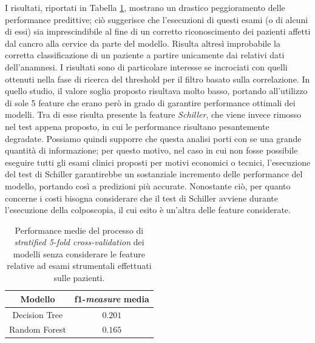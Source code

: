 I risultati, riportati in Tabella \ref{tab:noexamsscore}, mostrano un drastico peggioramento delle performance predittive; ciò suggerisce che l'esecuzioni di questi esami (o di alcuni di essi) sia imprescindibile al fine di un corretto riconoscimento dei pazienti affetti dal cancro alla cervice da parte del modello. 
Risulta altresì improbabile la corretta classificazione di un paziente a partire unicamente dai relativi dati dell'anamnesi.
I risultati sono di particolare interesse se incrociati con quelli ottenuti nella fase di ricerca del threshold per il filtro basato sulla correlazione. In quello studio, il valore soglia proposto risultava molto basso, portando all'utilizzo di sole 5 feature che erano però in grado di garantire performance ottimali dei modelli. Tra di esse risulta presente la feature \textit{Schiller}, che viene invece rimosso nel test appena proposto, in cui le performance risultano pesantemente degradate. Possiamo quindi supporre che questa analisi porti con se una grande quantità di informazione; per questo motivo, nel caso in cui non fosse possibile eseguire tutti gli esami clinici proposti per motivi economici o tecnici, l'esecuzione del test di Schiller garantirebbe un sostanziale incremento delle performance del modello, portando così a predizioni più accurate.
Nonostante ciò, per quanto concerne i costi bisogna considerare che il test di Schiller avviene durante l'esecuzione della colposcopia, il cui esito è un'altra delle feature considerate.
\begin{table}
	\centering
	\caption{Performance medie del processo di \textit{stratified 5-fold cross-validation} dei modelli senza considerare le feature relative ad esami strumentali effettuati sulle pazienti.}
	\label{tab:noexamsscore}
	\begin{tabular}{|c|c|}
		\toprule
		Modello & f1-\textit{measure} media \\ 
		\midrule 
		Decision Tree & $0.201$ \\
		Random Forest & $0.165$ \\ 
		\bottomrule
	\end{tabular}
\end{table}